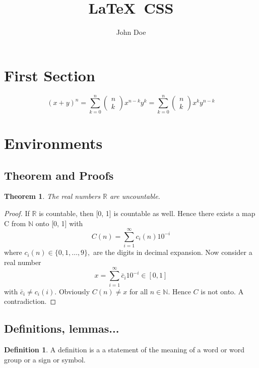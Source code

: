\documentclass{article}
\newtheorem{theorem}{Theorem}
\theoremstyle{definition}
\newtheorem{definition}{Definition}
\begin{document}
	\title{\LaTeX\ CSS}
	\author{John Doe}
	
	\maketitle
	
	\begin{abstract}
		\lipsum[66]
	\end{abstract}

	\tableofcontents
	
	\section{First Section}
	\lipsum[66]
	 $$(x+y)^{n}=\sum_{k=0}^{n}\left(\begin{array}{l}n \\
		k\end{array}\right) x^{n-k}
	y^{k}=\sum_{k=0}^{n}\left(\begin{array}{l}n \\ k\end{array}\right)
	x^{k} y^{n-k}$$
	\lipsum[75]
	
	\section{Environments}
	\lipsum[75]
	\subsection{Theorem and Proofs}
	\begin{theorem}
		The real numbers $\mathbb{R}$ are uncountable.
	\end{theorem}
	\begin{proof}
	If $\mathbb{R}$ is countable, then [0, 1] is countable as well. Hence
	there exists a map C from $\mathbb{N}$ onto [0, 1] with
	$$C(n)=\sum_{i=1}^{\infty} c_{i}(n) 10^{-i}$$ where $c_{i}(n)
	\in\{0,1, \ldots, 9\},$ are the digits in decimal expansion. Now
	consider a real number $$x=\sum_{i=1}^{\infty} \bar{c}_{i} 10^{-i}
	\in[0,1]$$ with $\bar{c}_{i} \neq c_{i}(i)$. Obviously $C(n) \neq x$
	for all $n \in \mathbb{N} .$ Hence $C$ is not onto. A contradiction.
	\end{proof}

\subsection{Definitions, lemmas...}

\begin{definition}
A definition is a a statement of the meaning of a word or word group or a sign or symbol.
\end{definition}
\end{document}
